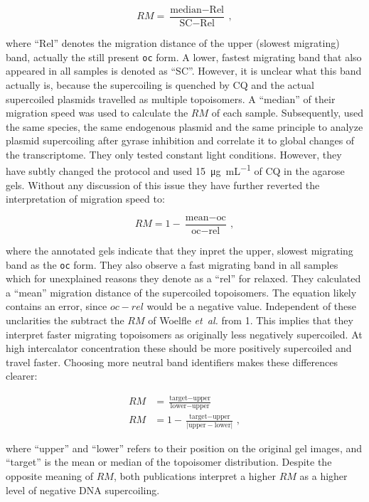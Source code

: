 \documentclass[10pt,a4]{article}
\newcommand{\ugml}{\micro\gram\per\milli\liter}
\newcommand{\etal}{\textit{et~al.}}
\begin{document}
\begin{equation}
  RM = \frac{\text{median} - \text{Rel}}{\text{SC} - \text{Rel}}\,,
\end{equation}

where ``Rel'' denotes the migration distance of the upper (slowest
migrating) band, actually the still present \texttt{oc} form.
A lower, fastest migrating band that also appeared in all samples
is denoted as ``SC''. However, it is unclear what this band actually
is, because the supercoiling is quenched by CQ and the actual
supercoiled plasmids travelled as multiple topoisomers. A ``median'' of
their migration speed was used to calculate the $RM$ of each sample.
%
Subsequently, \citet{Vijayan2009} used the same species,
the same endogenous plasmid and the same principle to analyze plasmid
supercoiling after gyrase inhibition and correlate it to global
changes of the transcriptome. They only tested constant light
conditions.  However, they have subtly changed the protocol and used
\SI{15}{\ugml} of CQ in the agarose gels. Without any discussion of
this issue they have further reverted the interpretation of migration
speed to:

\begin{equation}
  RM = 1 - \frac{\text{mean} - \text{oc}}{\text{oc} - \text{rel}}\,,
\end{equation}

where the annotated gels indicate that they inpret the upper, slowest
migrating band as the \texttt{oc} form. They also observe a fast
migrating band in all samples which for unexplained reasons they
denote as a ``rel'' for relaxed. They calculated a ``mean'' migration
distance of the supercoiled topoisomers. The equation likely contains
an error, since $oc-rel$ would be a negative value. Independent of
these unclarities the subtract the $RM$ of Woelfle \etal{} from
1. This implies that they interpret faster migrating topoisomers
as originally less negatively supercoiled. At high intercalator
concentration these should be more positively supercoiled and travel
faster.
%
Choosing more neutral band identifiers makes these
differences clearer:

\begin{align}
  RM &= \frac{\text{target} - \text{upper}}{\text{lower} - \text{upper}}\\
  RM &=1-\frac{\text{target} - \text{upper}}{\lvert \text{upper} - \text{lower} \rvert}\,,
\end{align}

where ``upper'' and ``lower'' refers to their position on the original
gel images, and ``target'' is the mean or median of the topoisomer
distribution.  Despite the opposite meaning of $RM$, both publications
interpret a higher $RM$ as a higher level of negative DNA
supercoiling.
 
\end{document}
